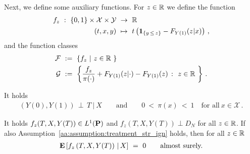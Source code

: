 Next, we define some auxiliary functions.
  For $z\in\R$ we define the function
  \begin{align*}
    f_z
    \ 
    :
    \ 
      \left\{ 0,1 \right\}
      \times
      \mathcal{X}
      \times
      \mathcal{Y}
    &
    \ 
    \to
    \ 
    \R
    \\
      (t,x,y)
    &
      \ 
      \mapsto
      \ 
      t
      \left( 
        \mathbf{1}
        _{\left\{  y\,\le\,z \right\}}
        -
        F_{Y(1)}(z|x)
      \right)
      \,,
  \end{align*}
  and the function classes
  \begin{gather}
    \label{F_g}
    \begin{split}
    \mathcal{F}
    &
    \ 
    :=
    \ 
    \left\{ 
      f_z
      \ 
      |
      \ 
      z\in\R\ 
    \right\}
    \\
    \mathcal{G}
    &
    \ 
    :=
    \ 
    \left\{ 
      \frac{f_z}{\pi(\cdot)}
      +
      F_{Y(1)}(z|\cdot)
      -
      F_{Y(1)}(z)
      \ 
      \colon
      \ 
      z\in\R\ 
    \right\}
    \,.
    \end{split}
  \end{gather}
  \begin{assumption}
    \label{aa:assumption:treatment_str_ign}
    It holds 
    \begin{gather*}
    (Y(0),Y(1))\, \perp\,  T \ |\  X
    \qquad
    \text{and}
    \qquad
      0
      \ 
      <
      \ 
      \pi(x)
      \ 
      <
      \ 
      1
      \quad
      \text{for all}\ 
      x\in\mathcal{X}
      \,.
    \end{gather*}
  \end{assumption}
  \begin{lemma}
    \label{aa:mean:r3:lem:fz_E}
    It holds
    $f_z(T,X,Y(T))\in L^1(\P)$
    and 
    $f_z(T,X,Y(T))\perp D_N$
    for all $z\in\R$.
    If also Assumption~\ref{aa:assumption:treatment_str_ign} holds,
    then 
    for all $z\in\R$
    \begin{gather*}
      \E
      \left[
        f_z
        \left( 
          T,
          X,
          Y(T)
        \right)
        \,
        |
        \,
        X
      \right]
      \ 
      =
      \ 
      0
      \qquad
      \text{almost surely.}
    \end{gather*}
  \end{lemma}
